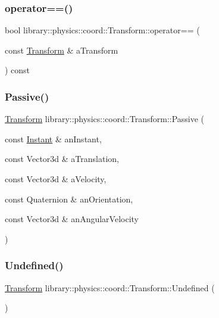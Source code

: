 \subsubsection{\texorpdfstring{operator==()}{operator==()}}
{\footnotesize\ttfamily bool library\+::physics\+::coord\+::\+Transform\+::operator== (\begin{DoxyParamCaption}\item[{const \hyperlink{classlibrary_1_1physics_1_1coord_1_1_transform}{Transform} \&}]{a\+Transform }\end{DoxyParamCaption}) const}

\mbox{\label{classlibrary_1_1physics_1_1coord_1_1_transform_ac8d745aa497d7713a19aa8652acb02c6}} 
\subsubsection{\texorpdfstring{Passive()}{Passive()}}
{\footnotesize\ttfamily \hyperlink{classlibrary_1_1physics_1_1coord_1_1_transform}{Transform} library\+::physics\+::coord\+::\+Transform\+::\+Passive (\begin{DoxyParamCaption}\item[{const \hyperlink{classlibrary_1_1physics_1_1time_1_1_instant}{Instant} \&}]{an\+Instant,  }\item[{const Vector3d \&}]{a\+Translation,  }\item[{const Vector3d \&}]{a\+Velocity,  }\item[{const Quaternion \&}]{an\+Orientation,  }\item[{const Vector3d \&}]{an\+Angular\+Velocity }\end{DoxyParamCaption})\hspace{0.3cm}{\ttfamily [static]}}

\mbox{\label{classlibrary_1_1physics_1_1coord_1_1_transform_ac346b5703e94945a10ab222bf38d2a08}} 
\subsubsection{\texorpdfstring{Undefined()}{Undefined()}}
{\footnotesize\ttfamily \hyperlink{classlibrary_1_1physics_1_1coord_1_1_transform}{Transform} library\+::physics\+::coord\+::\+Transform\+::\+Undefined (\begin{DoxyParamCaption}{ }\end{DoxyParamCaption})\hspace{0.3cm}{\ttfamily [static]}}



